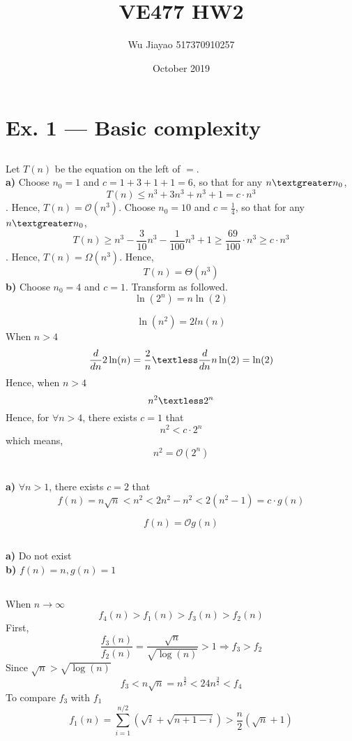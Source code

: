 \documentclass[12pt,a4paper]{article}
\title{VE477 HW2}
\author{Wu Jiayao 517370910257 }
\date{October 2019}
\theoremstyle{definition}
\begin{document}
\maketitle
\section{Ex. 1 — Basic complexity}
\subsection{}
Let $T(n)$ be the equation on the left of $=$. \\
\newline
\textbf{a)} Choose $n_0 =1$ and $c=1+3+1+1=6$, so that for any $n \textgreater n_0$, 
$$
  T(n) \leq n^3+3n^3+n^3+1 = c \cdot n^3
$$. 
Hence, $T(n) = \mathcal{O} (n^3)$.
Choose $n_0 =10$ and $c=\frac{1}{4}$, so that for any $n \textgreater n_0$, 
$$
  T(n) \geq n^3-\frac{3}{10}n^3-\frac{1}{100}n^3+1 \geq \frac{69}{100} \cdot n^3 \geq c \cdot n^3
$$. 
Hence, $T(n) = \Omega (n^3)$.
Hence, 
$$
  T(n) = \Theta(n^3)
$$
\newline
\textbf{b)} Choose $n_0 = 4$ and $c = 1$. Transform as followed.
$$
  \ln(2^n) = n\ln(2)
$$

$$
\ln(n^2) = 2ln(n)
$$
When $n>4$
$$
\frac{d}{dn}2\ln(n)=\frac{2}{n} \textless \frac{d}{dn}n\ln(2) = \ln(2) 
$$
Hence, when $n>4$
$$
  n^2 \textless 2^n
$$
Hence, for $\forall n>4$, there exists $c=1$ that
$$
  n^2 < c \cdot 2^n
$$
which means,
$$
  n^2 =\mathcal{O}(2^n)
$$
\newline

\subsection{}
\textbf{a)} $\forall n>1$, there exists $c=2$ that
$$
  f(n)=n\sqrt{n}<n^2<2n^2-n^2<2(n^2-1)=c \cdot g(n)
$$

$$
  f(n)=\mathcal{O}g(n)
$$
\subsection{}
\textbf{a)} Do not exist\\
\newline
\textbf{b)} $f(n)=n,g(n)=1$
\subsection{}
When $n \rightarrow \infty$
$$
  f_4(n) >f_1(n) >f_3(n) > f_2(n)
$$
\newline
First,
$$
  \frac{f_3(n)}{f_2(n)}=\frac{\sqrt{n}}{\sqrt{\log(n)}} > 1 \Rightarrow f_3 > f_2
$$
\newline
Since $\sqrt{n} > \sqrt{\log(n)}$
$$
  f_3 < n \sqrt{n} = n^{\frac{3}{2}} < 24n^{\frac{3}{2}} <f_4
$$
\newline
To compare $f_3$ with $f_1$
$$
  f_1(n)=\sum_{i=1}^{n/2}(\sqrt{i}+\sqrt{n+1-i}) > \frac{n}{2}(\sqrt{n}+1)
$$
\end{document}
